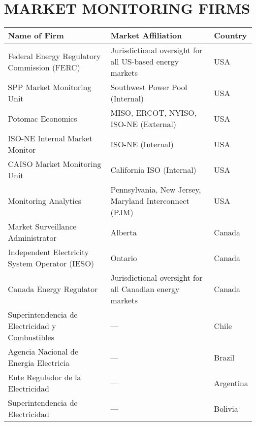 
\chapter{\uppercase {Market Monitoring Firms}}\label{appendix:E}

\begin{table}[ht]
    \centering
    \begin{tabular}{|p{8cm}|p{6cm}|p{2cm}|}
        \hline
        \textbf{Name of Firm} & \textbf{Market Affiliation} & \textbf{Country} \\
        \hline
        Federal Energy Regulatory Commission \newline (FERC) & Jurisdictional oversight for all US-based energy markets & USA \\
        \hline
        SPP Market Monitoring Unit & Southwest Power Pool (Internal) & USA  \\
        \hline
        Potomac Economics & MISO, ERCOT, NYISO, ISO-NE (External) & USA \\
        \hline
        ISO-NE Internal Market Monitor & ISO-NE (Internal) & USA \\
        \hline
        CAISO Market Monitoring Unit & California ISO (Internal) & USA \\
        \hline
        Monitoring Analytics & Pennsylvania, New Jersey, \newline Maryland Interconnect (PJM) & USA \\
        \hline
        Market Surveillance Administrator & Alberta & Canada \\
        \hline
        Independent Electricity System Operator \newline (IESO) & Ontario & Canada \\
        \hline
        Canada Energy Regulator & Jurisdictional oversight for all \newline Canadian energy markets & Canada \\
        \hline
        Superintendencia de \newline Electricidad y Combustibles & \centering --- & Chile \\
        \hline
        Agencia Nacional de Energia Electricia & \centering --- & Brazil \\
        \hline
        Ente Regulador de la Electricidad & \centering --- & Argentina \\
        \hline
        Superintendencia de Electricidad & \centering --- & Bolivia \\

\end{tabular}
\end{table}
